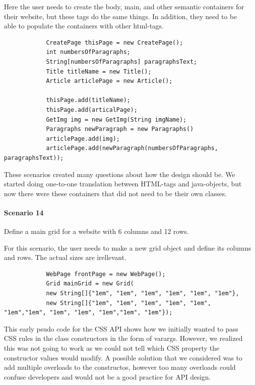 \documentclass[12pt]{article}
\begin{document}
    Here the user needs to create the body, main, and other semantic containers for their website, but these tags do the same things. In addition, they need to be able to populate the containers with other html-tags.

    \begin{shaded}
        \begin{lstlisting}
            CreatePage thisPage = new CreatePage();
            int numbersOfParagraphs;
            String[numbersOfParagraphs] paragraphsText;
            Title titleName = new Title();
            Article articlePage = new Article();

            thisPage.add(titleName);
            thisPage.add(articalPage);
            GetImg img = new GetImg(String imgName);
            Paragraphs newParagraph = new Paragraphs()
            articlePage.add(img);
            articlePage.add(newParagraph(numbersOfParagraphs, paragraphsText));

        \end{lstlisting}
    \end{shaded}
    
    These scenarios created many questions about how the design should be. We started doing one-to-one translation between HTML-tags and java-objects, but now there were these containers that did not need to be their own classes.

    \paragraph{Scenario 14}
    Define a main grid for a website with 6 columns and 12 rows.
    
    For this scenario, the user needs to make a new grid object and define its columns and rows. The actual sizes are irellevant. 

    \begin{shaded}
        \begin{lstlisting}
            WebPage frontPage = new WebPage();
            Grid mainGrid = new Grid(
            new String[]{"1em", "1em", "1em", "1em", "1em", "1em"},
            new String[]{"1em", "1em", "1em", "1em", "1em", "1em","1em", "1em", "1em", "1em","1em", "1em"});
        \end{lstlisting}
    \end{shaded}

    This early psudo code for the CSS API shows how we initially wanted to pass CSS rules in the class constructors in the form of varargs. However, we realized this was not going to work as we could not tell which CSS property the constructor values would modify. A possible solution that we considered was to add multiple overloads to the constructos, however too many overloads could confuse developers and would not be a good practice for API design.
\end{document}
